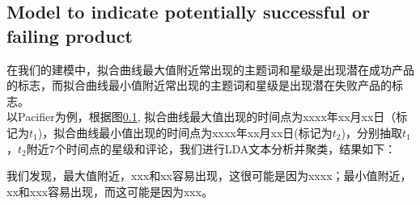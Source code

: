 \documentclass{mcmthesis}
\begin{document}
\subsection{Model to indicate potentially successful or failing product}
在我们的建模中，拟合曲线最大值附近常出现的主题词和星级是出现潜在成功产品的标志，而拟合曲线最小值附近常出现的主题词和星级是出现潜在失败产品的标志。\\

以Pacifier为例，根据图\ref{}, 拟合曲线最大值出现的时间点为xxxx年xx月xx日（标记为$t_{1}$)，拟合曲线最小值出现的时间点为xxxx年xx月xx日(标记为$t_{2}$)，分别抽取$t_{1}$，$t_{2}$附近7个时间点的星级和评论，我们进行LDA文本分析并聚类，结果如下：

我们发现，最大值附近，xxx和xx容易出现，这很可能是因为xxxx；最小值附近，xx和xxx容易出现，而这可能是因为xxx。
\end{document}
